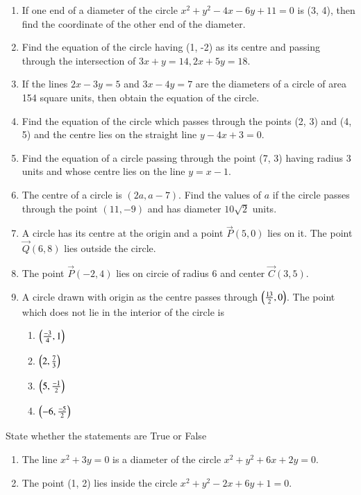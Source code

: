 \begin{enumerate}[label=\thesubsection.\arabic*, ref=\thesubsection.\theenumi, resume*]
 \item If one end of a diameter of the circle $x^2+y^2-4x-6y+11 =0$ is (3, 4),  then find the coordinate of the other end of the diameter.
 \item Find the equation of the circle having (1, -2) as its centre  and passing through the intersection of $3x+y=14,  2x+5y=18$.
\item If the lines $2x-3y=5$ and $3x-4y=7$ are the diameters of a circle of area 154 square units,  then obtain the equation of the circle.
\item Find the equation of the circle which passes through the points (2, 3) and (4, 5) and the centre lies on the straight line $y-4x+3=0$.
\item Find the equation of a circle passing through the point (7, 3) having radius 3 units and whose centre lies on the line $y=x-1$.
\item The centre of a circle is $(2a,  a-7)$. Find the values of $a$ if the circle passes through the point $(11,  -9)$ and has diameter $10\sqrt{2}$ units.
\item A circle has its centre at the origin and a point $\vec{P}(5,  0)$ lies on it. The point $\vec{Q}(6,  8)$ lies outside the circle.
 \item The point $\vec{P}(-2,  4)$ lies on circie of radius 6 and center $\vec{C}(3,  5)$.
\item A circle drawn with origin as the
centre passes through 
		$\left(\frac{13}{2},  0\right)$. The
point which does not lie in the
interior of the circle is
\begin{enumerate}
\item $\left(\frac{-3}{4},  1\right)$
\item $\left(2,  \frac{7}{3}\right)$
\item $\left(5,  \frac{-1}{2}\right)$
\item $\left(-6,  \frac{-5}{2}\right)$
\end{enumerate}
\end{enumerate}
State whether the statements are True or False 
\begin{enumerate}[label=\thesubsection.\arabic*, ref=\thesubsection.\theenumi, resume*]
\item The line $x^2+3y=0$ is a diameter of the circle $x^2+y^2+6x+2y=0$.
\item The point (1, 2) lies inside the circle $x^2+y^2-2x+6y+1=0$.
\end{enumerate}
